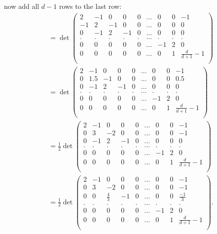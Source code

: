     now add all $d-1$ rows to the last row:
    \begin{align*}
        &=\det\begin{pmatrix}
            2 & -1 &  0  & 0 & 0 &\dots & 0 & 0 & -1\\
            -1 & 2  &  -1 & 0 & 0 &\dots & 0 & 0 & 0\\
            0 & -1  &  2 & -1 & 0 & \dots & 0 & 0 & 0\\
            . & .  &  . & . & . & \dots & . & . & .\\
            0 & 0  &  0 & 0 & 0 & \dots & -1 & 2 & 0\\
            0 & 0  &  0 & 0 & 0 &\dots & 0 & 1 & \frac{d}{d+1}-1\\
        \end{pmatrix}\\
        &=\det\begin{pmatrix}
            2 & -1 &  0  & 0 & 0 &\dots & 0 & 0 & -1\\
            0 & 1.5  &  -1 & 0 & 0 &\dots & 0 & 0 & 0.5\\
            0 & -1  &  2 & -1 & 0 & \dots & 0 & 0 & 0\\
            . & .  &  . & . & . & \dots & . & . & .\\
            0 & 0  &  0 & 0 & 0 & \dots & -1 & 2 & 0\\
            0 & 0  &  0 & 0 & 0 &\dots & 0 & 1 & \frac{d}{d+1}-1\\
        \end{pmatrix}\\
        &=\frac{1}{2}\det\begin{pmatrix}
            2 & -1 &  0  & 0 & 0 &\dots & 0 & 0 & -1\\
            0 & 3  &  -2 & 0 & 0 &\dots & 0 & 0 & -1\\
            0 & -1  &  2 & -1 & 0 & \dots & 0 & 0 & 0\\
            . & .  &  . & . & . & \dots & . & . & .\\
            0 & 0  &  0 & 0 & 0 & \dots & -1 & 2 & 0\\
            0 & 0  &  0 & 0 & 0 &\dots & 0 & 1 & \frac{d}{d+1}-1\\
        \end{pmatrix}\\
            &=\frac{1}{2}\det\begin{pmatrix}
            2 & -1 &  0  & 0 & 0 &\dots & 0 & 0 & -1\\
            0 & 3  &  -2 & 0 & 0 &\dots & 0 & 0 & -1\\
            0 & 0  &  \frac{4}{3} & -1 & 0 & \dots & 0 & 0 & \frac{-1}{3}\\
            . & .  &  . & . & . & \dots & . & . & .\\
            0 & 0  &  0 & 0 & 0 & \dots & -1 & 2 & 0\\
            0 & 0  &  0 & 0 & 0 &\dots & 0 & 1 & \frac{d}{d+1}-1\\
        \end{pmatrix}.
    \end{align*}

